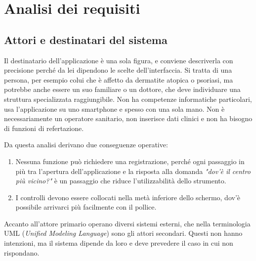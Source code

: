 \chapter{Analisi dei requisiti}\label{ch:analisi-dei-requisiti}

\section{Attori e destinatari del sistema}\label{sec:attori-sistema}

Il destinatario dell'applicazione è una sola figura, e conviene descriverla con precisione perché da lei dipendono le scelte dell'interfaccia.
Si tratta di una persona, per esempio colui che è affetto da dermatite atopica o psoriasi, ma potrebbe anche essere un suo
familiare o un dottore, che deve individuare una struttura specializzata raggiungibile.
Non ha competenze informatiche particolari, usa l'applicazione su uno smartphone e spesso con una sola mano.
Non è necessariamente un operatore sanitario, non inserisce dati clinici e non ha bisogno di funzioni di refertazione.

Da questa analisi derivano due conseguenze operative:
\begin{enumerate}
  \item Nessuna funzione può richiedere una registrazione, perché ogni passaggio in più tra l'apertura dell'applicazione e
  la risposta alla domanda \emph{"dov'è il centro più vicino?"} è un passaggio che riduce l'utilizzabilità dello strumento.
  \item I controlli devono essere collocati nella metà inferiore dello schermo,
  dov'è possibile arrivarci più facilmente con il pollice.
\end{enumerate}

Accanto all'attore primario operano diversi sistemi esterni, che nella terminologia UML (\textit{Unified Modeling Language}) sono gli attori secondari.
Questi non hanno intenzioni, ma il sistema dipende da loro e deve prevedere il caso in cui non rispondano.

